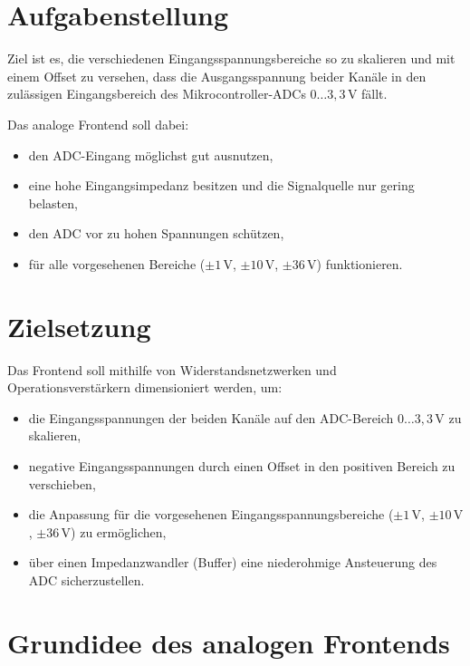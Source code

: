 \documentclass{article}
\begin{document}
	\section{Aufgabenstellung}
	
	Ziel ist es, die verschiedenen Eingangsspannungsbereiche so zu skalieren und 
	mit einem Offset zu versehen, dass die Ausgangsspannung beider Kanäle in den zulässigen 
	Eingangsbereich des Mikrocontroller-ADCs \(0\dots 3{,}3\,\mathrm{V}\) fällt.
	
	Das analoge Frontend soll dabei:
	\begin{itemize}
		\item den ADC-Eingang möglichst gut ausnutzen,
		\item eine hohe Eingangsimpedanz besitzen und die Signalquelle nur gering belasten,
		\item den ADC vor zu hohen Spannungen schützen,
		\item für alle vorgesehenen Bereiche (\(\pm 1\,\mathrm{V}\), \(\pm 10\,\mathrm{V}\), \(\pm 36\,\mathrm{V}\)) funktionieren.
	\end{itemize}
	
	\section{Zielsetzung}
	
	Das Frontend soll mithilfe von Widerstandsnetzwerken und Operationsverstärkern dimensioniert werden, um:
	\begin{itemize}
		\item die Eingangsspannungen der beiden Kanäle auf den ADC-Bereich 
		\(0 \dots 3{,}3\,\mathrm{V}\) zu skalieren,
		\item negative Eingangsspannungen durch einen Offset in den positiven Bereich zu verschieben,
		\item die Anpassung für die vorgesehenen Eingangsspannungsbereiche 
		(\(\pm 1\,\mathrm{V}\), \(\pm 10\,\mathrm{V}\), \(\pm 36\,\mathrm{V}\)) zu ermöglichen,
		\item über einen Impedanzwandler (Buffer) eine niederohmige Ansteuerung des ADC sicherzustellen.
	\end{itemize}
	
	\newpage
	
	\section{Grundidee des analogen Frontends}
	
\end{document}
